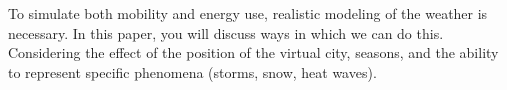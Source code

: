 \documentclass[../paper.tex]{subfiles}
\begin{document}
To simulate both mobility and energy use, realistic modeling of the weather is necessary.
In this paper, you will discuss ways in which we can do this.
Considering the effect of the position of the virtual city, seasons, and the ability to represent specific phenomena (storms, snow, heat waves).
\end{document}
